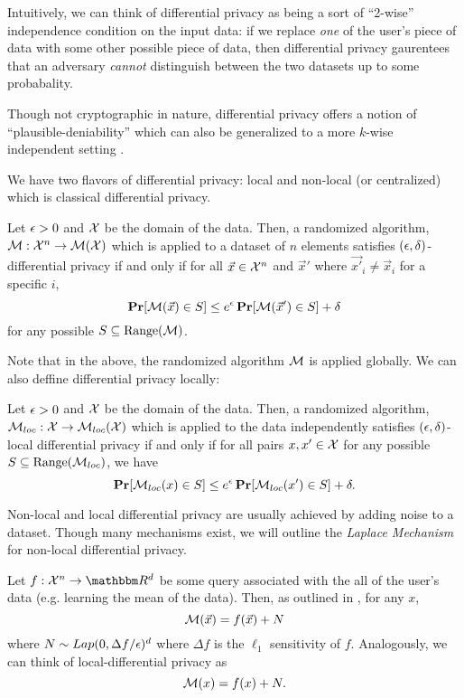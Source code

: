 \documentclass[11pt]{article}
\begin{document}
Intuitively, we can think of differential privacy as being a sort of ``2-wise'' independence condition on the input data: if we replace \emph{one} of the user's piece of data with some other possible piece of data, then differential privacy gaurentees that an adversary \emph{cannot} distinguish between the two datasets up to some probabality.

Though not cryptographic in nature, differential privacy offers a notion of ``plausible-deniability'' which can also be generalized to a more $k$-wise independent setting .

We have two flavors of differential privacy: local and non-local (or centralized) which is classical differential privacy.


\begin{definition}
	Let $\epsilon > 0$ and $\mathcal{X}$ be the domain of the data.
	Then, a randomized algorithm, $\mathcal{M} : \mathcal{X}^n \rightarrow \mathcal{M}(\mathcal{X})$ which is applied to a dataset of $n$ elements satisfies $(\epsilon, \delta)$-differential privacy if and only if for all $\vec{x} \in \mathcal{X}^n$ and $\vec{x}'$ where $\vec{x'}_i \neq \vec{x}_i$ for a specific $i$,
	\[
		\operatorname*{\mathbf{Pr}}[\mathcal{M}(\vec{x}) \in S] \leq e^\epsilon \operatorname*{\mathbf{Pr}}[\mathcal{M}(\vec{x}') \in S] + \delta
	\]
	for any possible $S \subseteq \text{Range}(\mathcal{M})$.
\end{definition}

Note that in the above, the randomized algorithm $\mathcal{M}$ is applied globally.
We can also deffine differential privacy locally:

\begin{definition}
	Let $\epsilon > 0$ and $\mathcal{X}$ be the domain of the data.
	Then, a randomized algorithm, $\mathcal{M}_{loc} : \mathcal{X} \rightarrow \mathcal{M}_{loc}(\mathcal{X})$ which is applied to the data independently satisfies $(\epsilon, \delta)$-local differential privacy if and only if for all pairs $x, x' \in \mathcal{X}$
	for any possible $S \subseteq \text{Range}(\mathcal{M}_{loc})$, we have
	\[
		\operatorname*{\mathbf{Pr}}[\mathcal{M}_{loc}(x) \in S] \leq e^\epsilon \operatorname*{\mathbf{Pr}}[\mathcal{M}_{loc}(x') \in S] + \delta.
	\]
\end{definition}

Non-local and local differential privacy are usually achieved by adding noise to a dataset.
Though many mechanisms exist, we will outline the \emph{Laplace Mechanism} for non-local differential privacy.

Let $f: \mathcal{X}^n \rightarrow \R^d$ be some query associated with the all of the user's data (e.g. learning the mean of the data).
Then, as outlined in \cite{Bassily_2015}, for any $x$,
\[
	\mathcal{M}(\vec{x}) = f(\vec{x}) + N
\]
where $N \sim Lap(0, \Delta f/ \epsilon)^{d}$ where $\Delta f$ is the $\ell_1$ sensitivity of $f$.
Analogously, we can think of local-differential privacy as \[
	\mathcal{M}(x) = f(x) + N.
\]
\end{document}
